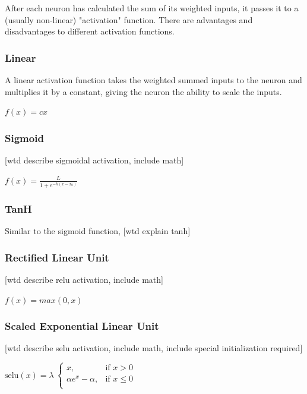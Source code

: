 After each neuron has calculated the sum of its weighted inputs, it passes it to a (usually non-linear) "activation" function.  There are advantages and disadvantages to different activation functions.


\subsubsection{Linear}

A linear activation function takes the weighted summed inputs to the neuron and multiplies it by a constant, giving the neuron the ability to scale the inputs.

{\centering
  $f(x)=cx$\par
}


\subsubsection{Sigmoid}
[wtd describe sigmoidal activation, include math]

{\centering
	$\displaystyle f(x)={\frac {L}{1+e^{-k(x-x_{0})}}}$\par
}

\subsubsection{TanH}

Similar to the sigmoid function, [wtd explain tanh]

\subsubsection{Rectified Linear Unit}
[wtd describe relu activation, include math]

{\centering
	$f(x)=max(0, x)$\par
}

\subsubsection{Scaled Exponential Linear Unit}
[wtd describe selu activation, include math, include special initialization required]


{\centering
	$\text{selu}(x) = \lambda\ \begin{cases}
    x,& \text{if } x > 0\\
    \alpha e^{x} - \alpha,& \text{if } x\leq 0\\
	\end{cases}$
	\par
}


